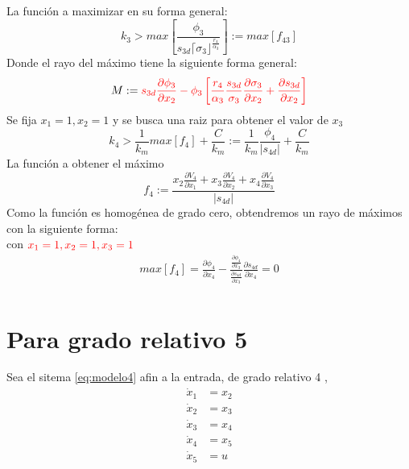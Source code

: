 La función a maximizar en su forma general:
\begin{equation}
k_3> max \left[ \frac{ \phi_3}{s_{3d} \lceil \sigma_3 \rfloor^{\frac{r_4}{\alpha_3}}} \right]:=max \left[ f_{43} \right]
\end{equation}
Donde el rayo del máximo tiene la siguiente forma general:
\begin{equation*}
M:=\textcolor{red}{s_{3d} \frac{\partial \phi_3}{\partial x_2}- \phi_3 \left[ \frac{r_4}{\alpha_3} \frac{s_{3d} }{\sigma_3}  \frac{\partial \sigma_3}{\partial x_2} +  \frac{\partial s_{3d}}{\partial x_2}  \right]}
\end{equation*}
Se fija $x_1=1, x_2=1$ y se busca una raiz para obtener el valor de $x_3$
\begin{equation}
  k_4> \frac{1}{k_m} max \left[  f_4 \right]+\frac{C}{k_m}:=\frac{1}{k_m}\frac{\phi_4}{|s_{4d}|}+\frac{C}{k_m}
\end{equation}
La función a obtener el máximo
\begin{equation}
  f_4:= \frac{ x_2 \frac{\partial V_4}{\partial x_1} + x_3 \frac{\partial V_4}{\partial x_2} + x_4 \frac{\partial V_4}{\partial x_3}  }{|s_{4d}|}
\end{equation}
Como la función es homogénea de grado cero, obtendremos un rayo de máximos con la siguiente forma:\\
con $\textcolor{red}{x_1=1, x_2=1, x_3=1}$
\begin{equation}
  \begin{split}
    max \left[  f_4 \right]=\frac{\partial \phi_4}{\partial x_4}- \frac{ \frac{\partial \phi_4}{\partial x_3}}{\frac{\partial s_{4d}}{\partial x_3}}\frac{\partial s_{4d}}{\partial x_4}=0\\
  \end{split}
\end{equation}

\section{Para grado relativo 5}
Sea el sitema \ref{eq:modelo4} afin a la entrada, de grado relativo 4 , 
\begin{subequations}\label{eq:modelo4}
  \begin{align}\label{eq:modelo1a}
    \dot{x}_1&=x_2 \\
    \dot{x}_2&=x_3 \\
    \dot{x}_3&=x_4 \\
    \dot{x}_4&=x_5 \\
    \dot{x}_5&=u
  \end{align}
\end{subequations}


